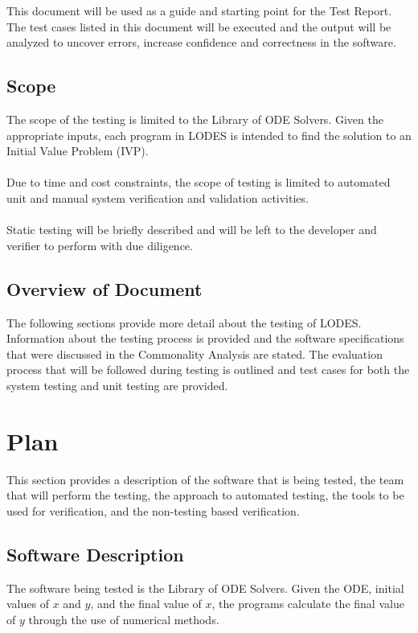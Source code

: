 \documentclass[12pt, titlepage]{article}
\newcommand{\famname}{LODES} %
\newcommand{\famdesc}{Library of ODE Solvers}
\begin{document}
This document will be used as a guide and starting point for the Test Report. The test cases
listed in this document will be executed and the output will be analyzed to uncover errors, increase confidence 
and correctness in the software.

\subsection{Scope} \label{sec_scope}
The scope of the testing is limited to the \famdesc{}. Given the appropriate inputs, each program in \famname{} is 
intended to find
the solution to an Initial Value Problem (IVP).\\
\\
Due to time and cost constraints, the scope of testing is limited to automated unit and manual system verification 
and validation activities.\\
\\
Static testing will be briefly described and will be left to the developer and verifier to perform with due diligence.

\subsection{Overview of Document} \label{sec_overview}
The following sections provide more detail about the testing of \famname{}.
Information about the testing process is provided and the software specifications
that were discussed in the Commonality Analysis are stated.
The evaluation process that will be followed during testing is outlined and test cases
for both the system testing and unit testing are provided.

\section{Plan}
This section provides a description of the software that is being tested, the team that will
perform the testing, the approach to automated testing, the tools to be used for verification,
and the non-testing based verification. 
	
\subsection{Software Description}
The software being tested is the \famdesc{}. Given the ODE, initial values of $x$ and $y$, and the final value of 
$x$,
the programs calculate the final value of $y$ through the use of numerical methods.
\end{document}
